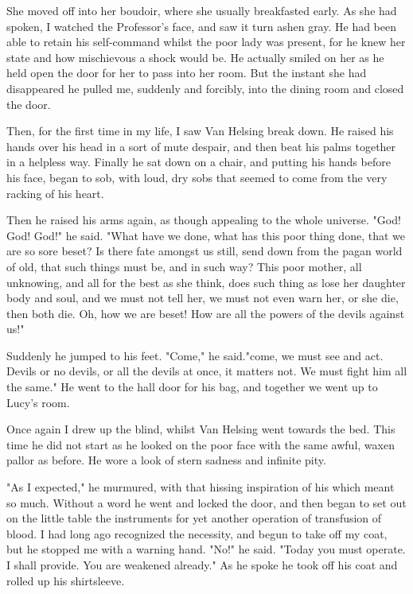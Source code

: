 She moved off into her boudoir, where she usually breakfasted early. As she had spoken, I watched the Professor's face, and saw it turn ashen gray. He had been able to retain his self-command whilst the poor lady was present, for he knew her state and how mischievous a shock would be. He actually smiled on her as he held open the door for her to pass into her room. But the instant she had disappeared he pulled me, suddenly and forcibly, into the dining room and closed the door. 

Then, for the first time in my life, I saw Van Helsing break down. He raised his hands over his head in a sort of mute despair, and then beat his palms together in a helpless way. Finally he sat down on a chair, and putting his hands before his face, began to sob, with loud, dry sobs that seemed to come from the very racking of his heart. 

Then he raised his arms again, as though appealing to the whole universe. "God! God! God!" he said. "What have we done, what has this poor thing done, that we are so sore beset? Is there fate amongst us still, send down from the pagan world of old, that such things must be, and in such way? This poor mother, all unknowing, and all for the best as she think, does such thing as lose her daughter body and soul, and we must not tell her, we must not even warn her, or she die, then both die. Oh, how we are beset! How are all the powers of the devils against us!" 

Suddenly he jumped to his feet. "Come," he said."come, we must see and act. Devils or no devils, or all the devils at once, it matters not. We must fight him all the same." He went to the hall door for his bag, and together we went up to Lucy's room. 

Once again I drew up the blind, whilst Van Helsing went towards the bed. This time he did not start as he looked on the poor face with the same awful, waxen pallor as before. He wore a look of stern sadness and infinite pity. 

"As I expected," he murmured, with that hissing inspiration of his which meant so much. Without a word he went and locked the door, and then began to set out on the little table the instruments for yet another operation of transfusion of blood. I had long ago recognized the necessity, and begun to take off my coat, but he stopped me with a warning hand. "No!" he said. "Today you must operate. I shall provide. You are weakened already." As he spoke he took off his coat and rolled up his shirtsleeve. 

